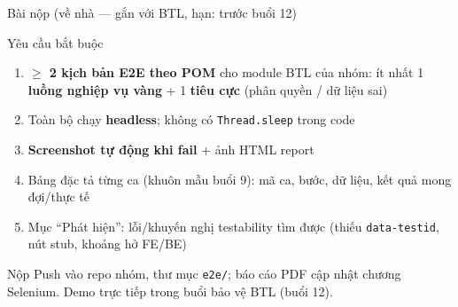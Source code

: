 \documentclass[aspectratio=169,12pt]{beamer}
\begin{document}
\begin{frame}{Bài nộp (về nhà --- gắn với BTL, hạn: trước buổi 12)}
  \begin{block}{Yêu cầu bắt buộc}
    \begin{enumerate}
      \item \textbf{$\geq$ 2 kịch bản E2E theo POM} cho module BTL của
            nhóm: ít nhất 1 \textbf{luồng nghiệp vụ vàng} +
            1 \textbf{tiêu cực} (phân quyền / dữ liệu sai)
      \item Toàn bộ chạy \textbf{headless}; không có
            \texttt{Thread.sleep} trong code
      \item \textbf{Screenshot tự động khi fail} + ảnh HTML report
      \item Bảng đặc tả từng ca (khuôn mẫu buổi 9): mã ca, bước,
            dữ liệu, kết quả mong đợi/thực tế
      \item Mục ``Phát hiện'': lỗi/khuyến nghị testability tìm được
            (thiếu \texttt{data-testid}, nút stub, khoảng hở FE/BE)
    \end{enumerate}
  \end{block}

  \begin{alertblock}{Nộp}
    Push vào repo nhóm, thư mục \texttt{e2e/}; báo cáo PDF cập nhật
    chương Selenium. Demo trực tiếp trong buổi bảo vệ BTL (buổi 12).
  \end{alertblock}
\end{frame}
\end{document}

